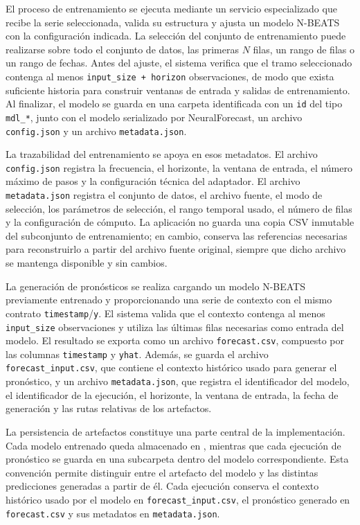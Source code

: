 El proceso de entrenamiento se ejecuta mediante un servicio especializado que recibe la serie seleccionada, valida su estructura y ajusta un modelo N-BEATS con la configuración indicada. La selección del conjunto de entrenamiento puede realizarse sobre todo el conjunto de datos, las primeras \(N\) filas, un rango de filas o un rango de fechas. Antes del ajuste, el sistema verifica que el tramo seleccionado contenga al menos \texttt{input\_size + horizon} observaciones, de modo que exista suficiente historia para construir ventanas de entrada y salidas de entrenamiento. Al finalizar, el modelo se guarda en una carpeta identificada con un \texttt{id} del tipo \texttt{mdl\_*}, junto con el modelo serializado por NeuralForecast, un archivo \texttt{config.json} y un archivo \texttt{metadata.json}.

La trazabilidad del entrenamiento se apoya en esos metadatos. El archivo \texttt{config.json} registra la frecuencia, el horizonte, la ventana de entrada, el número máximo de pasos y la configuración técnica del adaptador. El archivo \texttt{metadata.json} registra el conjunto de datos, el archivo fuente, el modo de selección, los parámetros de selección, el rango temporal usado, el número de filas y la configuración de cómputo. La aplicación no guarda una copia CSV inmutable del subconjunto de entrenamiento; en cambio, conserva las referencias necesarias para reconstruirlo a partir del archivo fuente original, siempre que dicho archivo se mantenga disponible y sin cambios.

La generación de pronósticos se realiza cargando un modelo N-BEATS previamente entrenado y proporcionando una serie de contexto con el mismo contrato \texttt{timestamp}/\texttt{y}. El sistema valida que el contexto contenga al menos \texttt{input\_size} observaciones y utiliza las últimas filas necesarias como entrada del modelo. El resultado se exporta como un archivo \texttt{forecast.csv}, compuesto por las columnas \texttt{timestamp} y \texttt{yhat}. Además, se guarda el archivo \texttt{forecast\_input.csv}, que contiene el contexto histórico usado para generar el pronóstico, y un archivo \texttt{metadata.json}, que registra el identificador del modelo, el identificador de la ejecución, el horizonte, la ventana de entrada, la fecha de generación y las rutas relativas de los artefactos.

La persistencia de artefactos constituye una parte central de la implementación. Cada modelo entrenado queda almacenado en , mientras que cada ejecución de pronóstico se guarda en una subcarpeta  dentro del modelo correspondiente. Esta convención permite distinguir entre el artefacto del modelo y las distintas predicciones generadas a partir de él. Cada ejecución conserva el contexto histórico usado por el modelo en \texttt{forecast\_input.csv}, el pronóstico generado en \texttt{forecast.csv} y sus metadatos en \texttt{metadata.json}.

